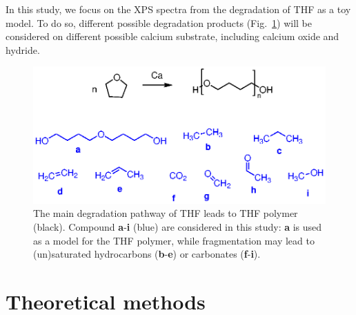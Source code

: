 \documentclass[12pt,a4paper]{article}
\begin{document}
In this study, we focus on the XPS spectra from the degradation of THF as a toy model. To do so, different possible degradation products (Fig.~\ref{fig:THFdegradation}) will be considered on different possible calcium substrate, including calcium oxide and hydride.

\begin{figure}
	\centering
	\includegraphics{Figure1}
	\caption{The main degradation pathway of THF leads to THF polymer (black). Compound \textbf{a}-\textbf{i} (blue) are considered in this study: \textbf{a} is used as a model for the THF polymer, while fragmentation may lead to (un)saturated hydrocarbons (\textbf{b}-\textbf{e}) or carbonates (\textbf{f}-\textbf{i}).}
	\label{fig:THFdegradation}
\end{figure}

\section{Theoretical methods}
\end{document}
